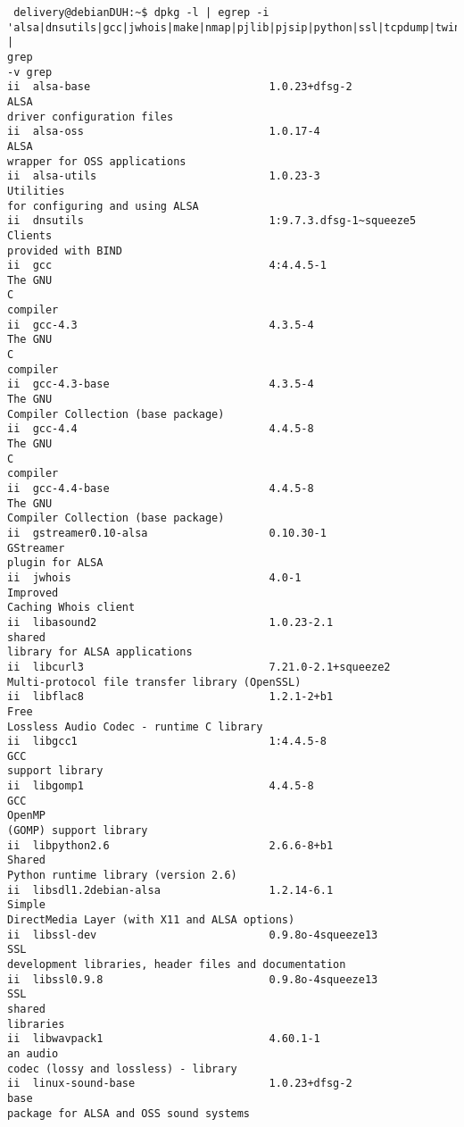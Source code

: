 \documentclass[a4paper,12pt]{report}
\newenvironment{myscriptlisting}
{\begin{list}{}{\setlength{\leftmargin}{1em}}\item\scriptsize\bfseries}
{\end{list}}
\begin{document}
\begin{myscriptlisting}
 \begin{verbatim}
 delivery@debianDUH:~$ dpkg -l | egrep -i
'alsa|dnsutils|gcc|jwhois|make|nmap|pjlib|pjsip|python|ssl|tcpdump|twinkle' |
grep
-v grep
ii  alsa-base                            1.0.23+dfsg-2                  ALSA
driver configuration files
ii  alsa-oss                             1.0.17-4                       ALSA
wrapper for OSS applications
ii  alsa-utils                           1.0.23-3                      
Utilities
for configuring and using ALSA
ii  dnsutils                             1:9.7.3.dfsg-1~squeeze5        Clients
provided with BIND
ii  gcc                                  4:4.4.5-1                      The GNU
C
compiler
ii  gcc-4.3                              4.3.5-4                        The GNU
C
compiler
ii  gcc-4.3-base                         4.3.5-4                        The GNU
Compiler Collection (base package)
ii  gcc-4.4                              4.4.5-8                        The GNU
C
compiler
ii  gcc-4.4-base                         4.4.5-8                        The GNU
Compiler Collection (base package)
ii  gstreamer0.10-alsa                   0.10.30-1                     
GStreamer
plugin for ALSA
ii  jwhois                               4.0-1                          Improved
Caching Whois client
ii  libasound2                           1.0.23-2.1                     shared
library for ALSA applications
ii  libcurl3                             7.21.0-2.1+squeeze2           
Multi-protocol file transfer library (OpenSSL)
ii  libflac8                             1.2.1-2+b1                     Free
Lossless Audio Codec - runtime C library
ii  libgcc1                              1:4.4.5-8                      GCC
support library
ii  libgomp1                             4.4.5-8                        GCC
OpenMP
(GOMP) support library
ii  libpython2.6                         2.6.6-8+b1                     Shared
Python runtime library (version 2.6)
ii  libsdl1.2debian-alsa                 1.2.14-6.1                     Simple
DirectMedia Layer (with X11 and ALSA options)
ii  libssl-dev                           0.9.8o-4squeeze13              SSL
development libraries, header files and documentation
ii  libssl0.9.8                          0.9.8o-4squeeze13              SSL
shared
libraries
ii  libwavpack1                          4.60.1-1                       an audio
codec (lossy and lossless) - library
ii  linux-sound-base                     1.0.23+dfsg-2                  base
package for ALSA and OSS sound systems

\end{verbatim}
\end{myscriptlisting}
\end{document}

